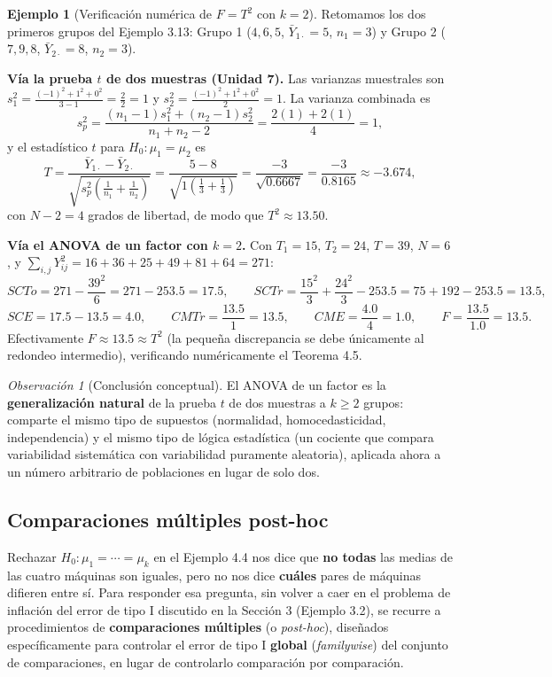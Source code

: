 \documentclass[11pt,a4paper]{article}
\theoremstyle{plain}
\theoremstyle{definition}
\newtheorem{ejemplo}[teorema]{Ejemplo}
\theoremstyle{remark}
\newtheorem{observacion}[teorema]{Observación}
\begin{document}
\begin{ejemplo}[Verificación numérica de $F=T^2$ con $k=2$]
Retomamos los dos primeros grupos del Ejemplo 3.13: Grupo 1 ($4,6,5$, $\bar Y_{1\cdot}=5$, $n_1=3$) y Grupo 2 ($7,9,8$, $\bar Y_{2\cdot}=8$, $n_2=3$).

\medskip
\noindent\textbf{Vía la prueba $t$ de dos muestras (Unidad 7).} Las varianzas muestrales son $s_1^2=\frac{(-1)^2+1^2+0^2}{3-1}=\frac{2}{2}=1$ y $s_2^2=\frac{(-1)^2+1^2+0^2}{2}=1$. La varianza combinada es
\[
s_p^2 = \frac{(n_1-1)s_1^2+(n_2-1)s_2^2}{n_1+n_2-2} = \frac{2(1)+2(1)}{4} = 1,
\]
y el estadístico $t$ para $H_0:\mu_1=\mu_2$ es
\[
T = \frac{\bar Y_{1\cdot}-\bar Y_{2\cdot}}{\sqrt{s_p^2\left(\frac{1}{n_1}+\frac{1}{n_2}\right)}} = \frac{5-8}{\sqrt{1\left(\frac13+\frac13\right)}} = \frac{-3}{\sqrt{0.6667}} = \frac{-3}{0.8165} \approx -3.674,
\]
con $N-2=4$ grados de libertad, de modo que $T^2\approx13.50$.

\medskip
\noindent\textbf{Vía el ANOVA de un factor con $k=2$.} Con $T_1=15$, $T_2=24$, $T=39$, $N=6$, y $\sum_{i,j}Y_{ij}^2=16+36+25+49+81+64=271$:
\[
SCTo = 271-\frac{39^2}{6} = 271-253.5 = 17.5, \qquad SCTr = \frac{15^2}{3}+\frac{24^2}{3}-253.5 = 75+192-253.5=13.5,
\]
\[
SCE = 17.5-13.5=4.0, \qquad CMTr=\frac{13.5}{1}=13.5, \qquad CME=\frac{4.0}{4}=1.0, \qquad F=\frac{13.5}{1.0}=13.5.
\]
Efectivamente $F\approx13.5\approx T^2$ (la pequeña discrepancia se debe únicamente al redondeo intermedio), verificando numéricamente el Teorema 4.5.
\end{ejemplo}

\begin{observacion}[Conclusión conceptual]
El ANOVA de un factor es la \textbf{generalización natural} de la prueba $t$ de dos muestras a $k\geq2$ grupos: comparte el mismo tipo de supuestos (normalidad, homocedasticidad, independencia) y el mismo tipo de lógica estadística (un cociente que compara variabilidad sistemática con variabilidad puramente aleatoria), aplicada ahora a un número arbitrario de poblaciones en lugar de solo dos.
\end{observacion}

\subsection{Comparaciones múltiples post-hoc}

Rechazar $H_0:\mu_1=\cdots=\mu_k$ en el Ejemplo 4.4 nos dice que \textbf{no todas} las medias de las cuatro máquinas son iguales, pero no nos dice \textbf{cuáles} pares de máquinas difieren entre sí. Para responder esa pregunta, sin volver a caer en el problema de inflación del error de tipo I discutido en la Sección 3 (Ejemplo 3.2), se recurre a procedimientos de \textbf{comparaciones múltiples} (o \emph{post-hoc}), diseñados específicamente para controlar el error de tipo I \textbf{global} (\emph{familywise}) del conjunto de comparaciones, en lugar de controlarlo comparación por comparación.
\end{document}
